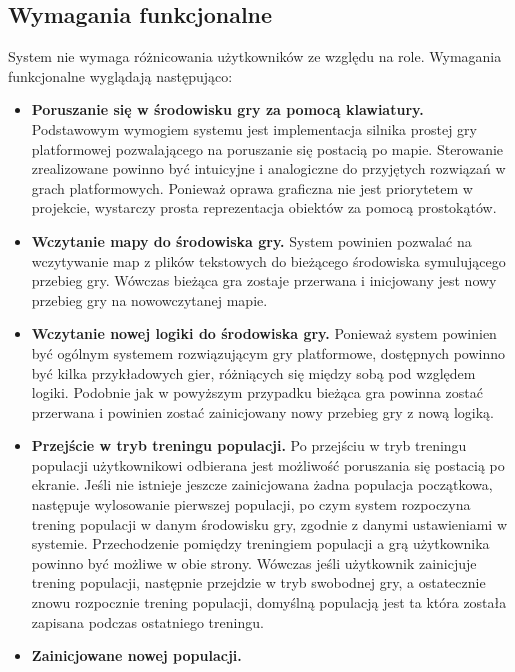 \subsection{Wymagania funkcjonalne}
	System nie wymaga różnicowania użytkowników ze względu na role. Wymagania funkcjonalne wyglądają następująco:
	\begin{itemize}
		\item {\bf Poruszanie się w środowisku gry za pomocą klawiatury.}
		\newline
		Podstawowym wymogiem systemu jest implementacja silnika prostej gry platformowej pozwalającego na poruszanie się postacią po mapie.
		Sterowanie zrealizowane powinno być intuicyjne i analogiczne do przyjętych rozwiązań w grach platformowych.
		Ponieważ oprawa graficzna nie jest priorytetem w projekcie, wystarczy prosta reprezentacja obiektów za pomocą prostokątów.
		\item {\bf Wczytanie mapy do środowiska gry.}
		\newline
		System powinien pozwalać na wczytywanie map z plików tekstowych do bieżącego środowiska symulującego przebieg gry.
		Wówczas bieżąca gra zostaje przerwana i inicjowany jest nowy przebieg gry na nowowczytanej mapie.
		\item {\bf Wczytanie nowej logiki do środowiska gry.}
		\newline
		Ponieważ system powinien być ogólnym systemem rozwiązującym gry platformowe, dostępnych powinno być kilka przykładowych gier,
		różniących się między sobą pod względem logiki. Podobnie jak w powyższym przypadku bieżąca gra powinna zostać przerwana i
		powinien zostać zainicjowany nowy przebieg gry z nową logiką.
		\item {\bf Przejście w tryb treningu populacji.}
		\newline
		Po przejściu w tryb treningu populacji użytkownikowi odbierana jest możliwość poruszania się postacią po ekranie.
		Jeśli nie istnieje jeszcze zainicjowana żadna populacja początkowa, następuje wylosowanie pierwszej populacji, po czym system rozpoczyna trening populacji w danym środowisku gry, zgodnie z danymi ustawieniami w systemie. Przechodzenie pomiędzy treningiem populacji a grą użytkownika powinno być możliwe w obie strony. 
		Wówczas jeśli użytkownik zainicjuje trening populacji, następnie przejdzie w tryb swobodnej gry, a ostatecznie znowu rozpocznie trening populacji, domyślną populacją jest ta która została zapisana podczas ostatniego treningu.
		\item {\bf Zainicjowane nowej populacji. }

\end{itemize}
